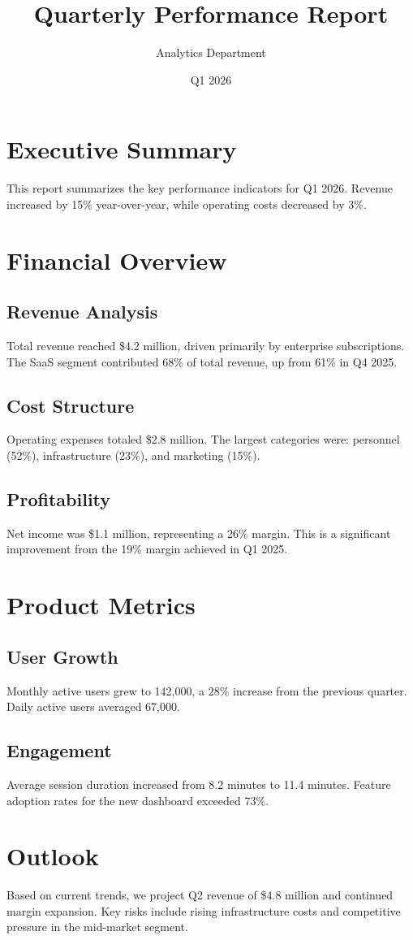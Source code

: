 \documentclass[12pt]{article}
\title{Quarterly Performance Report}
\author{Analytics Department}
\date{Q1 2026}
\begin{document}
\maketitle
\tableofcontents
\newpage

\section{Executive Summary}
This report summarizes the key performance indicators for Q1 2026. Revenue
increased by 15\% year-over-year, while operating costs decreased by 3\%.

\section{Financial Overview}
\subsection{Revenue Analysis}
Total revenue reached \$4.2 million, driven primarily by enterprise subscriptions.
The SaaS segment contributed 68\% of total revenue, up from 61\% in Q4 2025.

\subsection{Cost Structure}
Operating expenses totaled \$2.8 million. The largest categories were:
personnel (52\%), infrastructure (23\%), and marketing (15\%).

\subsection{Profitability}
Net income was \$1.1 million, representing a 26\% margin. This is a significant
improvement from the 19\% margin achieved in Q1 2025.

\section{Product Metrics}
\subsection{User Growth}
Monthly active users grew to 142,000, a 28\% increase from the previous quarter.
Daily active users averaged 67,000.

\subsection{Engagement}
Average session duration increased from 8.2 minutes to 11.4 minutes. Feature
adoption rates for the new dashboard exceeded 73\%.

\section{Outlook}
Based on current trends, we project Q2 revenue of \$4.8 million and continued
margin expansion. Key risks include rising infrastructure costs and competitive
pressure in the mid-market segment.
\end{document}
